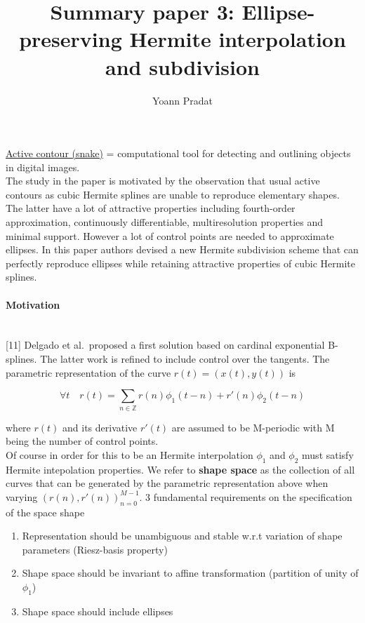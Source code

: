 \documentclass[a4paper, 11pt]{article}
\begin{document}
\title{Summary paper 3: Ellipse-preserving Hermite interpolation and subdivision}
\author{Yoann Pradat}
\maketitle

\noindent\underline{Active contour (snake)} = computational tool for detecting and outlining objects in digital 
images.\\ 

The study in the paper is motivated by the observation that usual active contours as cubic Hermite splines are unable to 
reproduce elementary shapes. The latter have a lot of attractive properties including fourth-order approximation, 
continuously differentiable, multiresolution properties and minimal support. However a lot of control points are needed 
to approximate ellipses. In this paper authors devised a new Hermite subdivision scheme that can perfectly reproduce 
ellipses while retaining attractive properties of cubic Hermite splines. 

\paragraph{Motivation} \mbox{} \\

[11] Delgado et al.\ proposed a first solution based on cardinal exponential B-splines. The latter work is refined to 
include control over the tangents. The parametric representation of the curve $r(t) = (x(t), y(t))$ is 

\begin{equation}
  \forall t \quad r(t) = \sum_{n \in \mathbb{Z}} r(n) \phi_1(t-n) + r'(n) \phi_2(t-n)
\end{equation}

where $r(t)$ and its derivative $r'(t)$ are assumed to be M-periodic with M being the number of control points. \\

Of course in order for this to be an Hermite interpolation $\phi_1$ and $\phi_2$ must satisfy Hermite intepolation 
properties. We refer to \textbf{shape space} as the collection of all curves that can be generated by the parametric 
representation above when varying ${\left(r(n), r'(n)\right)}_{n=0}^{M-1}$. 3 fundamental requirements on the 
specification of the space shape

\begin{enumerate}
  \item Representation should be unambiguous and stable w.r.t variation of shape parameters (Riesz-basis property)
  \item Shape space should be invariant to affine transformation (partition of unity of $\phi_1$)
  \item Shape space should include ellipses
\end{enumerate}
\end{document}
